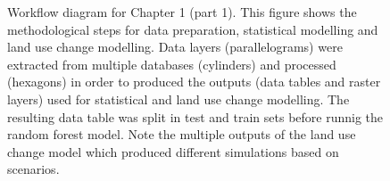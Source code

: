 \begin{figure}[h]
\caption[Workflow diagram for Chapter 1 (part 1)]{Workflow diagram for Chapter 1 (part 1). This figure shows the methodological steps for data preparation, statistical modelling and land use change modelling. Data layers (parallelograms) were extracted from multiple databases (cylinders) and processed (hexagons) in order to produced the outputs (data tables and raster layers) used for statistical and land use change modelling. The resulting data table was split in test and train sets before runnig the random forest model. Note the multiple outputs of the land use change model which produced different simulations based on scenarios. }
\label{fig:workflow1}
\end{figure}
\clearpage

